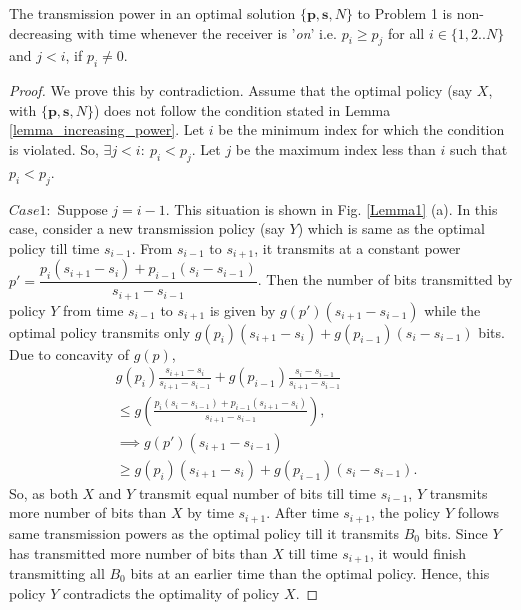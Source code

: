 
\begin{lemma}
The transmission power in an optimal solution $\{\bm{p},\bm{s},N\}$ to Problem 1 is non-decreasing with time whenever the receiver is '\textit{on}' i.e. $p_i\ge p_j$ for all $i\in \{1,2..N\}$ and $j<i$, if $p_i\neq 0$. 
\label{lemma_increasing_power}
\end{lemma}
\begin{proof}
We prove this by contradiction. Assume that the optimal policy (say $X$, with $\{\bm{p},\bm{s},N\}$) does not follow the condition stated in Lemma \ref{lemma_increasing_power}. Let $i$ be the minimum index for which the condition is violated. So, $\exists j<i:\ p_i<p_j $. Let $j$ be the maximum index less than $i$ such that $p_i<p_j$. 

%

$Case 1:$ Suppose $j=i-1$. This situation is shown in Fig. \ref{Lemma1} (a). In this case, consider a new transmission policy (say $Y$) which is same as the optimal policy till time $s_{i-1}$. From $s_{i-1}$ to $s_{i+1}$, it transmits at a constant power $p'=\dfrac{p_i(s_{i+1}-s_{i})+p_{i-1}(s_{i}-s_{i-1})}{s_{i+1}-s_{i-1}}$. Then the number of bits transmitted by policy $Y$ from time $s_{i-1}$ to $s_{i+1}$ is given by $g(p')(s_{i+1}-s_{i-1})$ while the optimal policy transmits only $g(p_i)(s_{i+1}-s_{i})+g(p_{i-1})(s_{i}-s_{i-1})$ bits. Due to concavity of $g(p)$,
\begin{align*}
&g(p_i)\frac{s_{i+1}-s_{i}}{s_{i+1}-s_{i-1}}+g(p_{i-1})\frac{s_{i}-s_{i-1}}{s_{i+1}-s_{i-1}}
\\ 
&\le g\left(\frac{p_i(s_{i}-s_{i-1})+p_{i-1}(s_{i+1}-s_{i})}{s_{i+1}-s_{i-1}}\right),
\\
&\implies g(p')(s_{i+1}-s_{i-1})
\\
&\ge g(p_i)(s_{i+1}-s_{i})+g(p_{i-1})(s_{i}-s_{i-1}).  
\end{align*}
So, as both $X$ and $Y$ transmit equal number of bits till time $s_{i-1}$, $Y$ transmits more number of bits than $X$ by time $s_{i+1}$. After time $s_{i+1}$, the policy $Y$ follows same transmission powers as the optimal policy till it transmits $B_0$ bits. Since $Y$ has transmitted more number of bits than $X$ till time $s_{i+1}$, it would finish transmitting all $B_0$ bits at an earlier time than the optimal policy. Hence, this policy $Y$ contradicts the optimality of policy $X$.


\end{proof}
